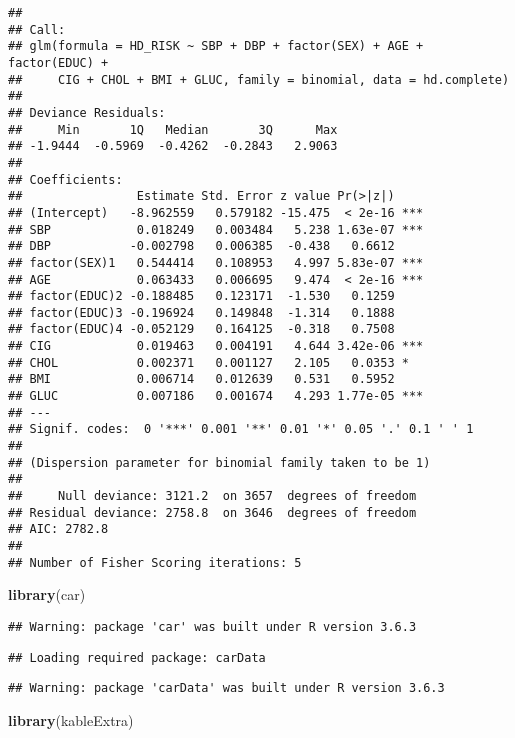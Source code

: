 \documentclass[
]{article}
\newenvironment{Shaded}{\begin{snugshade}}{\end{snugshade}}
\newcommand{\KeywordTok}[1]{\textcolor[rgb]{0.13,0.29,0.53}{\textbf{#1}}}
\newcommand{\NormalTok}[1]{#1}
\begin{document}
\begin{verbatim}
## 
## Call:
## glm(formula = HD_RISK ~ SBP + DBP + factor(SEX) + AGE + factor(EDUC) + 
##     CIG + CHOL + BMI + GLUC, family = binomial, data = hd.complete)
## 
## Deviance Residuals: 
##     Min       1Q   Median       3Q      Max  
## -1.9444  -0.5969  -0.4262  -0.2843   2.9063  
## 
## Coefficients:
##                Estimate Std. Error z value Pr(>|z|)    
## (Intercept)   -8.962559   0.579182 -15.475  < 2e-16 ***
## SBP            0.018249   0.003484   5.238 1.63e-07 ***
## DBP           -0.002798   0.006385  -0.438   0.6612    
## factor(SEX)1   0.544414   0.108953   4.997 5.83e-07 ***
## AGE            0.063433   0.006695   9.474  < 2e-16 ***
## factor(EDUC)2 -0.188485   0.123171  -1.530   0.1259    
## factor(EDUC)3 -0.196924   0.149848  -1.314   0.1888    
## factor(EDUC)4 -0.052129   0.164125  -0.318   0.7508    
## CIG            0.019463   0.004191   4.644 3.42e-06 ***
## CHOL           0.002371   0.001127   2.105   0.0353 *  
## BMI            0.006714   0.012639   0.531   0.5952    
## GLUC           0.007186   0.001674   4.293 1.77e-05 ***
## ---
## Signif. codes:  0 '***' 0.001 '**' 0.01 '*' 0.05 '.' 0.1 ' ' 1
## 
## (Dispersion parameter for binomial family taken to be 1)
## 
##     Null deviance: 3121.2  on 3657  degrees of freedom
## Residual deviance: 2758.8  on 3646  degrees of freedom
## AIC: 2782.8
## 
## Number of Fisher Scoring iterations: 5
\end{verbatim}

\begin{Shaded}
\begin{Highlighting}[]
\KeywordTok{library}\NormalTok{(car)}
\end{Highlighting}
\end{Shaded}

\begin{verbatim}
## Warning: package 'car' was built under R version 3.6.3
\end{verbatim}

\begin{verbatim}
## Loading required package: carData
\end{verbatim}

\begin{verbatim}
## Warning: package 'carData' was built under R version 3.6.3
\end{verbatim}

\begin{Shaded}
\begin{Highlighting}[]
\KeywordTok{library}\NormalTok{(kableExtra)}
\end{Highlighting}
\end{Shaded}
\end{document}
